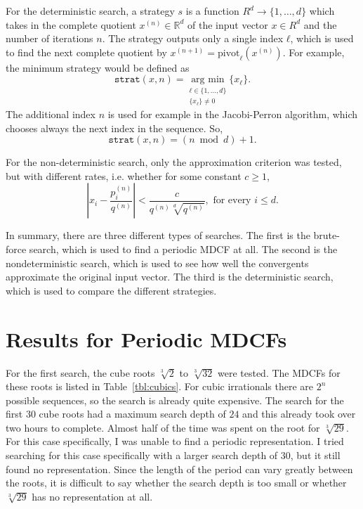 For the deterministic search, a strategy $s$ is a function $R^d → \{1, …, d\}$
which takes in the complete quotient $x^{(n)} ∈ ℝ^d$ of the input vector $x ∈ R^d$
and the number of iterations $n$.
The strategy outputs only a single index $ℓ$,
which is used to find the next complete quotient by $x^{(n+1)} =
\mathrm{pivot}_ℓ(x^{(n)})$.
For example, the minimum strategy would be defined as
\[
  \texttt{strat}(x, n) = \underset{\substack{ℓ ∈ \{1, …, d\} \\ \{x_ℓ\} ≠ 0}}{\text{arg min}} \{x_ℓ\}.
\]
The additional index $n$ is used for example in the Jacobi-Perron algorithm,
which chooses always the next index in the sequence.
So,
\[
  \texttt{strat}(x, n) = (n \bmod d) + 1.
\]

For the non-deterministic search, only the approximation criterion was tested,
but with different rates, i.e. whether for some constant $c ≥ 1$,
\[
  \left|x_i - \frac{p_i^{(n)}}{q^{(n)}}\right| < \frac{c}{q^{(n)} \sqrt[d]{q^{(n)}}}, \text{ for every } i ≤ d.
\]

In summary,
there are three different types of searches.
The first is the brute-force search, which is used to find a periodic MDCF at all.
The second is the nondeterministic search, which is used to see how well the
convergents approximate the original input vector.
The third is the deterministic search, which is used to compare the different
strategies.

\section{Results for Periodic MDCFs}

For the first search, the cube roots $\sqrt[3]{2}$ to $\sqrt[3]{32}$ were tested.
The MDCFs for these roots is listed in Table~\ref{tbl:cubics}.
For cubic irrationals there are $2^n$ possible sequences,
so the search is already quite expensive.
The search for the first 30 cube roots had a maximum search depth of $24$ and
this already took over two hours to complete.
Almost half of the time was spent on the root for $\sqrt[3]{29}$.
For this case specifically, I was unable to find a periodic representation.
I tried searching for this case specifically with a larger search depth of $30$,
but it still found no representation.
Since the length of the period can vary greatly between the roots, it is
difficult to say whether the search depth is too small or whether
$\sqrt[3]{29}$ has no representation at all.

